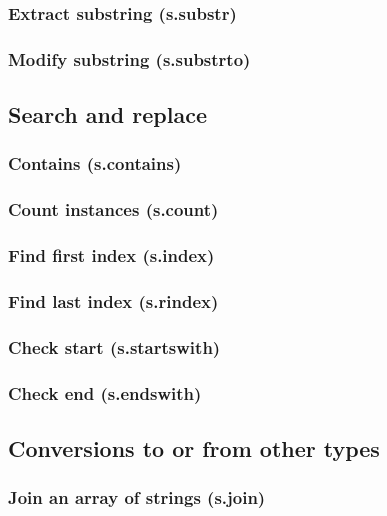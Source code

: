 \documentclass{article}
\theoremstyle{definition}
\begin{document}
\subsubsection{Extract substring (s.substr)}

\subsubsection{Modify substring (s.substrto)}

\subsection{Search and replace}

\subsubsection{Contains (s.contains)}

\subsubsection{Count instances (s.count)}

\subsubsection{Find first index (s.index)}

\subsubsection{Find last index (s.rindex)}

\subsubsection{Check start (s.startswith)}

\subsubsection{Check end (s.endswith)}

\subsection{Conversions to or from other types}

\subsubsection{Join an array of strings (s.join)}
\end{document}
